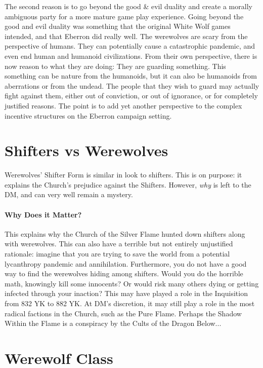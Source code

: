 \documentclass[twocolumn]{dndbook}
\begin{document}
The second reason is to go beyond the good \& evil duality and create a morally ambiguous party for a more mature game play experience.
Going beyond the good and evil duality was something that the original White Wolf games intended, and that Eberron did really well.
The werewolves are scary from the perspective of humans.
They can potentially cause a catastrophic pandemic, and even end human and humanoid civilizations.
From their own perspective, there is now reason to what they are doing:
They are guarding something. This something can be nature from the humanoids,
but it can also be humanoids from aberrations or from the undead.
The people that they wish to guard may actually fight against them, either out of conviction, or out of ignorance, or for completely justified reasons.
The point is to add yet another perspective to the complex incentive structures on the Eberron campaign setting.\par


\section*{Shifters vs Werewolves}

Werewolves' Shifter Form is similar in look to shifters.
This is on purpose: it explains the Church's prejudice against the Shifters.
However, \emph{why} is left to the DM, and can very well remain a mystery.\par

\paragraph*{Why Does it Matter?} This explains why the Church of the Silver Flame hunted down shifters along with werewolves.
This can also have a terrible but not entirely unjustified rationale:
imagine that you are trying to save the world from a potential lycanthropy pandemic and annihilation.
Furthermore, you do not have a good way to find the werewolves hiding among shifters.
Would you do the horrible math, knowingly kill some innocents? Or would risk many others dying or getting infected through your inaction?
This may have played a role in the Inquisition from 832 YK to 882 YK.
At DM's discretion, it may still play a role in the most radical factions in the Church, such as the Pure Flame.
Perhaps the Shadow Within the Flame is a conspiracy by the Cults of the Dragon Below...\par

\section*{Werewolf Class}
\end{document}
